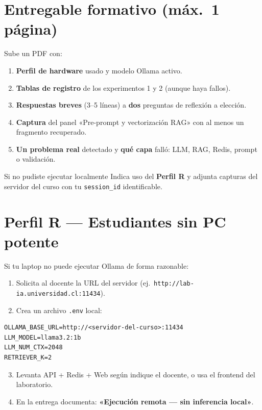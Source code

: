 \documentclass[12pt,a4paper]{article}
\begin{document}
\section{Entregable formativo (máx.\ 1 página)}

Sube un PDF con:

\begin{enumerate}[noitemsep]
  \item \textbf{Perfil de hardware} usado y modelo Ollama activo.
  \item \textbf{Tablas de registro} de los experimentos 1 y 2 (aunque haya fallos).
  \item \textbf{Respuestas breves} (3--5 líneas) a \textbf{dos} preguntas de reflexión
        a elección.
  \item \textbf{Captura} del panel «Pre-prompt y vectorización RAG» con al menos un
        fragmento recuperado.
  \item \textbf{Un problema real} detectado y \textbf{qué capa} falló: LLM, RAG,
        Redis, prompt o validación.
\end{enumerate}

\begin{examplebox}{Si no pudiste ejecutar localmente}
Indica uso del \textbf{Perfil R} y adjunta capturas del servidor del curso con tu
\texttt{session\_id} identificable.
\end{examplebox}

\section{Perfil R --- Estudiantes sin PC potente}
\label{sec:perfil-r}

Si tu laptop no puede ejecutar Ollama de forma razonable:

\begin{enumerate}[noitemsep]
  \item Solicita al docente la URL del servidor (ej.\
        \texttt{http://lab-ia.universidad.cl:11434}).
  \item Crea un archivo \texttt{.env} local:
\end{enumerate}

\begin{lstlisting}[style=envstyle]
OLLAMA_BASE_URL=http://<servidor-del-curso>:11434
LLM_MODEL=llama3.2:1b
LLM_NUM_CTX=2048
RETRIEVER_K=2
\end{lstlisting}

\begin{enumerate}[noitemsep]
  \setcounter{enumi}{2}
  \item Levanta API + Redis + Web según indique el docente, o usa el frontend del
        laboratorio.
  \item En la entrega documenta: \textbf{«Ejecución remota --- sin inferencia local»}.
\end{enumerate}
\end{document}
